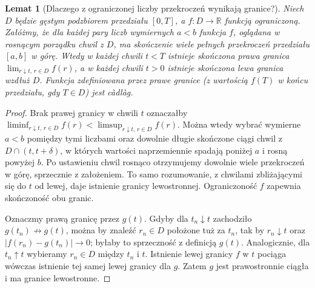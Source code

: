 \documentclass[11pt,a4paper,oneside]{report}
\numberwithin{equation}{chapter}
\theoremstyle{plain}
\newtheorem{lemat}[twierdzenie]{Lemat}
\theoremstyle{definition}
\theoremstyle{remark}
\newcommand{\R}{\mathbb{R}}
\begin{document}
\begin{lemat}[Dlaczego z ograniczonej liczby przekroczeń wynikają granice?]
Niech $D$ będzie gęstym podzbiorem przedziału $[0,T]$,
a $f:D\to\R$ funkcją ograniczoną. Załóżmy, że dla każdej
pary liczb wymiernych $a<b$ funkcja $f$, oglądana w
rosnącym porządku chwil z $D$, ma skończenie wiele pełnych
przekroczeń przedziału $[a,b]$ w górę. Wtedy w każdej chwili
$t<T$ istnieje skończona prawa granica
$\lim_{r\downarrow t,\,r\in D}f(r)$, a w każdej chwili
$t>0$ istnieje skończona lewa granica wzdłuż $D$.
Funkcja zdefiniowana przez prawe granice (z wartością $f(T)$
w końcu przedziału, gdy $T\in D$) jest c\`adl\`ag.
\end{lemat}
\begin{proof}
Brak prawej granicy w chwili $t$ oznaczałby
$\liminf_{r\downarrow t,\,r\in D}f(r)
<\limsup_{r\downarrow t,\,r\in D}f(r)$.
Można wtedy wybrać wymierne $a<b$ pomiędzy tymi
liczbami oraz dowolnie długie skończone ciągi chwil
z $D\cap(t,t+\delta)$, w których wartości naprzemiennie
spadają poniżej $a$ i rosną powyżej $b$.
Po ustawieniu chwil rosnąco otrzymujemy dowolnie wiele
przekroczeń w górę, sprzecznie z założeniem.
To samo rozumowanie, z chwilami zbliżającymi się do $t$
od lewej, daje istnienie granicy lewostronnej.
Ograniczoność $f$ zapewnia skończoność obu granic.

Oznaczmy prawą granicę przez $g(t)$. Gdyby dla
$t_n\downarrow t$ zachodziło $g(t_n)\not\to g(t)$,
można by znaleźć $r_n\in D$ położone tuż za $t_n$,
tak by $r_n\downarrow t$ oraz
$|f(r_n)-g(t_n)|\to0$; byłaby to sprzeczność z
definicją $g(t)$. Analogicznie, dla $t_n\uparrow t$
wybieramy $r_n\in D$ między $t_n$ i $t$.
Istnienie lewej granicy $f$ w $t$ pociąga wówczas
istnienie tej samej lewej granicy dla $g$.
Zatem $g$ jest prawostronnie ciągła i ma granice
lewostronne.
\end{proof}
\end{document}
